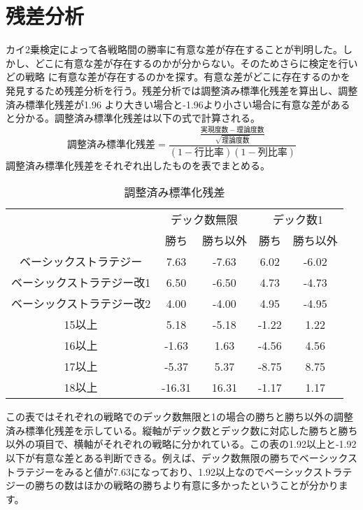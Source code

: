 \section{残差分析}
カイ2乗検定によって各戦略間の勝率に有意な差が存在することが判明した。しかし、どこに有意な差が存在するのかが分からない。そのためさらに検定を行いどの戦略
に有意な差が存在するのかを探す。有意な差がどこに存在するのかを発見するため残差分析を行う。残差分析では調整済み標準化残差を算出し、調整済み標準化残差が1.96
より大きい場合と-1.96より小さい場合に有意な差があると分かる。調整済み標準化残差は以下の式で計算される。
\begin{equation} 調整済み標準化残差 =  \frac{\frac{実現度数 - 理論度数}{\sqrt{理論度数}}}{(1-行比率)(1-列比率)} \end{equation}
調整済み標準化残差をそれぞれ出したものを表でまとめる。
\begin{table}[H]
 \begin{center}
  \begin{tabular}{|c|c|c|c|c|}
    \hline
     & \multicolumn{2}{c|}{デック数無限} & \multicolumn{2}{c|}{デック数1} \\
    \cline{2-5} & 勝ち & 勝ち以外 & 勝ち & 勝ち以外 \\
    \hline ベーシックストラテジー & 7.63 & -7.63 & 6.02 & -6.02  \\
    \hline ベーシックストラテジー改1 & 6.50 & -6.50 & 4.73 & -4.73  \\
    \hline ベーシックストラテジー改2 & 4.00 & -4.00 & 4.95 & -4.95  \\
    \hline 15以上 & 5.18 & -5.18 & -1.22 & 1.22  \\
    \hline 16以上 & -1.63 & 1.63 & -4.56 & 4.56  \\
    \hline 17以上 & -5.37 & 5.37 & -8.75 & 8.75  \\
    \hline 18以上 & -16.31 & 16.31 & -1.17 & 1.17  \\
    \hline
  \end{tabular}
 \end{center}
 \caption{調整済み標準化残差}
\end{table}
この表ではそれぞれの戦略でのデック数無限と1の場合の勝ちと勝ち以外の調整済み標準化残差を示している。縦軸がデック数とデック数に対応した勝ちと勝ち以外の項目で、横軸がそれぞれの戦略に分かれている。この表の1.92以上と-1.92以下が有意な差とある判断できる。例えば、デック数無限の勝ちでベーシックストラテジーをみると値が7.63になっており、1.92以上なのでベーシックストラテジーの勝ちの数はほかの戦略の勝ちより有意に多かったということが分かります。\\
